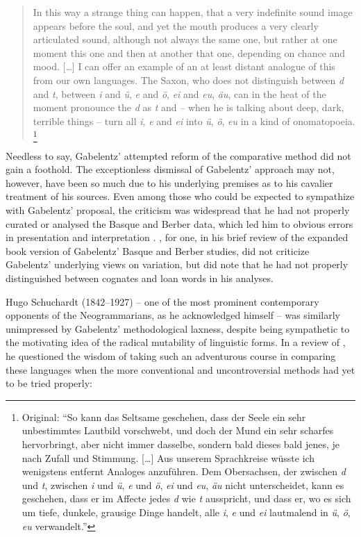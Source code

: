 \documentclass[output=paper]{langscibook}
\begin{document}
\begin{quotation}
In this way a strange thing can happen, that a very indefinite sound image appears before the soul, and yet the mouth produces a very clearly articulated sound, although not always the same one, but rather at one moment this one and then at another that one, depending on chance and mood. […] I can offer an example of an at least distant analogue of this from our own languages. The Saxon, who does not distinguish between \emph{d} and \emph{t}, between \emph{i} and \emph{ü}, \emph{e} and \emph{ö}, \emph{ei} and \emph{eu}, \emph{äu}, can in the heat of the moment pronounce the \emph{d} as \emph{t} and -- when he is talking about deep, dark, terrible things -- turn all \emph{i}, \emph{e} and \emph{ei} into \emph{ü}, \emph{ö}, \emph{eu} in a kind of onomatopoeia. \citep[606--607]{Gabelentz1893}\footnote{Original: ``So kann das Seltsame geschehen, dass der Seele ein sehr unbestimmtes Lautbild vorschwebt, und doch der Mund ein sehr scharfes hervorbringt, aber nicht immer dasselbe, sondern bald dieses bald jenes, je nach Zufall und Stimmung. […] Aus unserem Sprachkreise wüsste ich wenigstens entfernt Analoges anzuführen. Dem Obersachsen, der zwischen \emph{d} und \emph{t}, zwischen \emph{i} und \emph{ü}, \emph{e} und \emph{ö}, \emph{ei} und \emph{eu}, \emph{äu} nicht unterscheidet, kann es geschehen, dass er im Affecte jedes \emph{d} wie \emph{t} ausspricht, und dass er, wo es sich um tiefe, dunkele, grausige Dinge handelt, alle \emph{i}, \emph{e} und \emph{ei} lautmalend in \emph{ü}, \emph{ö}, \emph{eu} verwandelt.''}
\end{quotation}

Needless to say, Gabelentz' attempted reform of the comparative method did not gain a foothold. The exceptionless dismissal of Gabelentz' approach may not, however, have been so much due to his underlying premises as to his cavalier treatment of his sources. Even among those who could be expected to sympathize with Gabelentz' proposal, the criticism was widespread that he had not properly curated or analysed the Basque and Berber data, which led him to obvious errors in presentation and interpretation \citep[cf.][]{HurchPurgay2019}. \citet{Brinton1894}, for one, in his brief review of the \citeyear{Gabelentz1894bb} expanded book version of Gabelentz' Basque and Berber studies, did not criticize Gabelentz' underlying views on variation, but did note that he had not properly distinguished between cognates and loan words in his analyses.

Hugo Schuchardt (1842--1927) -- one of the most prominent contemporary opponents of the Neogrammarians, as he acknowledged himself \citep[see, e.g., ][]{Schuchardt1928} -- was similarly unimpressed by Gabelentz' methodological laxness, despite being sympathetic to the motivating idea of the radical mutability of linguistic forms. In a review of \citet{Gabelentz1894bb}, he questioned the wisdom of taking such an adventurous course in comparing these languages when the more conventional and uncontroversial methods had yet to be tried properly:
\end{document}

